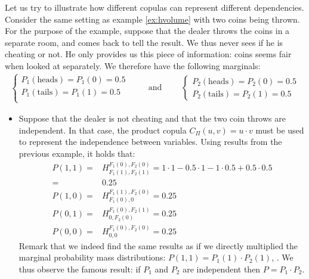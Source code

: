 \begin{example}\label{ex:copulas}
    Let us try to illustrate how different copulas can represent different dependencies. 
    Consider the same setting as example \ref{ex:hvolume} with two coins being thrown. For the purpose of the example, suppose that the dealer throws the coins in a separate room, and comes back to tell the result. We thus never sees if he is cheating or not. He only provides us this piece of information: coins seems fair when looked at separately. We therefore have the following marginals:
    \begin{eqnarray*}
    \begin{cases}
        P_1(\text{heads}) = P_1(0) = 0.5\\
        P_1(\text{tails}) = P_1(1) = 0.5\\
    \end{cases}
    \qquad\text{ and }\qquad
    \begin{cases}
        P_2(\text{heads}) = P_2(0) = 0.5\\
        P_2(\text{tails}) = P_2(1) = 0.5
    \end{cases}
    \end{eqnarray*}
    
    \begin{itemize}
        \item Suppose that the dealer is not cheating and that the two coin throws are independent. In that case, the product copula $C_\Pi(u,v)=u\cdot v$  must be used to represent the independence between variables.
        Using results from the previous example, it holds that:
        \begin{align*}
            P(1,1) =& H_{F_1(1), F_2(1)}^{F_1(0), F_2(0)} = 1\cdot1 - 0.5\cdot1 - 1\cdot0.5 + 0.5\cdot0.5\\
            =& 0.25\\
            P(1,0) =& H_{F_1(0), 0}^{F_1(1), F_2(0)} = 0.25 \\
            P(0,1) =& H_{0, F_2(0)}^{F_1(0), F_2(1)} = 0.25 \\
            P(0,0) =& H_{0, 0}^{F_1(0), F_2(0)} = 0.25
        \end{align*}
        Remark that we indeed find the same results as if we directly multiplied the marginal probability mass distributions: $P(1,1) = P_1(1)\cdot P_2(1)$, \etc. We thus observe the famous result: if $P_1$ and $P_2$ are independent then $P=P_1\cdot P_2$.
        

\end{itemize}
\end{example}
